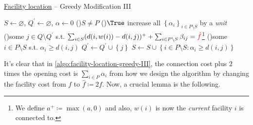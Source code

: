 \begin{algorithm}[H]\label{algo:facility-location-greedy-III}
	\DontPrintSemicolon
	\caption{\hyperref[prb:facility-location]{Facility location} -- Greedy Modification III}
	\BlankLine
	\(S\gets \varnothing \), \(Q^\prime \gets \varnothing \), \(\alpha \gets 0\) 
	\;
	\While(){\(S \neq P\)}{
	\While(){\(\True\)}{
	increase all \(\left\{ \alpha _i \right\}_{i\in P\setminus S} \) by a \emph{unit}\;
	\If(){some \(j\in Q\setminus Q^\prime \) s.t. \(\sum_{i\in S} (d(i, w(i)) - d(i, j))^+ + \sum_{i\in P\setminus S} \beta _{ij} = \mathcolor{red}{\hat{f}}\)\footnote{We define \(a^+ \coloneqq \max (a, 0)\) and also, \(w(i)\) is now the \emph{current} facility \(i\) is connected to.}}{
			\Break
		}
		\If(){some \(i\in P\setminus S\) s.t. \(\alpha_i \geq d(i, j)\)}{
			\Break
		}
	}
	\(Q^\prime \gets Q^\prime  \cup \left\{ j \right\} \)
	\(S\gets S \cup \left\{ i\in P\setminus S\colon \alpha _i \geq d(i, j)\right\} \)
	}
	\;
\end{algorithm}

It's clear that in \autoref{algo:facility-location-greedy-III}, the connection cost plus \(2\) times the opening cost is \(\sum_{i\in P} \alpha _i\) from how we design the algorithm by changing the facility cost from \(f\) to \(\hat{f} \coloneqq 2f\). Now, a crucial lemma is the following.

